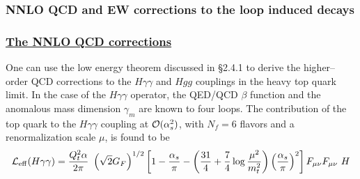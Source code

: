 \subsubsection{NNLO QCD and EW corrections to the loop induced decays} 

\subsubsection*{\underline{The NNLO QCD corrections}}

One can use the low energy theorem discussed in \S2.4.1 to derive the 
higher--order QCD corrections to the $H\gamma \gamma$ and $Hgg$ couplings 
in the heavy top quark limit.  In the case of the $H\gamma \gamma$ operator, 
the QED/QCD $\beta$ function and the anomalous mass dimension $\gamma_m$ 
are known to four loops.  The contribution of the top quark to the $H \gamma
\gamma$ coupling at ${\cal O}(\alpha_s^2)$, with $N_f=6$ flavors and a
renormalization scale $\mu$, is found to be \cite{RCste}
\begin{equation}
{\cal L}_{\rm eff} (H\gamma\gamma) = \frac{Q_t^2\alpha}{2\pi}~\left( \sqrt{2}
G_F \right)^{1/2} \left[ 1-\frac{\alpha_s}{\pi} - \left( \frac{31}{4}
+ \frac{7}{4} \log \frac{\mu^2}{m_t^2} \right) \left( \frac{\alpha_s}{\pi} 
\right)^2 \right] F_{\mu\nu} F_{\mu\nu}~H
\label{eq:LHgam}
\end{equation}

